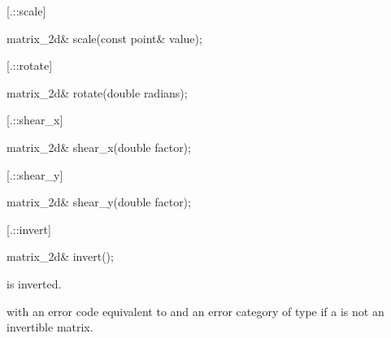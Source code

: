  [\iotwod.\matrixtwod::scale] {}
%
%
\begin{itemdecl}
matrix_2d& scale(const point& value);
\end{itemdecl}
\begin{itemdescr}
	\pnum
	\effects
	
	\pnum
	\returns
\end{itemdescr}

 [\iotwod.\matrixtwod::rotate] {}
%
%
\begin{itemdecl}
matrix_2d& rotate(double radians);
\end{itemdecl}
\begin{itemdescr}
	\pnum
	\effects
	
	\pnum
	\returns
\end{itemdescr}

 [\iotwod.\matrixtwod::shear_x] {}
%
%
\begin{itemdecl}
matrix_2d& shear_x(double factor);
\end{itemdecl}
\begin{itemdescr}
	\pnum
	\effects
	
	\pnum
	\returns
\end{itemdescr}

 [\iotwod.\matrixtwod::shear_y] {}
%
%
\begin{itemdecl}
matrix_2d& shear_y(double factor);
\end{itemdecl}
\begin{itemdescr}
	\pnum
	\effects
	
	\pnum
	\returns
\end{itemdescr}

 [\iotwod.\matrixtwod::invert] {}
%
%
\begin{itemdecl}
matrix_2d& invert();
\end{itemdecl}
\begin{itemdescr}
	\pnum
	\effects
	 is inverted.
	
	\pnum
	\returns
	
	\pnum
	\throws
	 with an error code equivalent to 
	 and an error category of type 
	 if a  is not an invertible matrix. 
\end{itemdescr}

